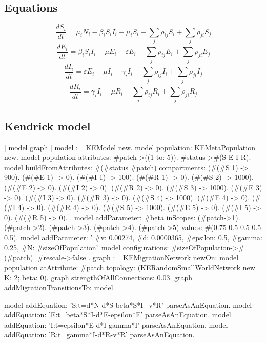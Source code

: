 \documentclass[a4paper,10pt,twoside]{book}
\begin{document}
\subsection{ Equations}

  \begin{equation}
    \frac{dS_i}{dt} = \mu_i N_i - \beta_i S_i I_i - \mu_i S_i - \sum_j \rho_{ij} S_i + \sum_j \rho_{ji} S_j
  \end{equation}
  \begin{equation}
    \frac{dE_i}{dt} = \beta_i S_i I_i - \mu E_i - \varepsilon E_i - \sum_j \rho_{ij} E_i + \sum_j \rho_{ji} E_j
  \end{equation}
  \begin{equation}
    \frac{dI_i}{dt} = \varepsilon E_i - \mu I_i - \gamma_i I_i - \sum_j \rho_{ij} I_i + \sum_j \rho_{ji} I_j
  \end{equation}
  \begin{equation}
    \frac{dR_i}{dt} = \gamma_i I_i - \mu R_i - \sum_j \rho_{ij} R_i + \sum_j \rho_{ji} R_j
  \end{equation}
  
\subsection{ Kendrick model}

\begin{code}{}
| model graph |
model := KEModel new.
model population: KEMetaPopulation new.
model population attributes: {
	#patch->((1 to: 5)).
	#status->#(S E I R)}.
model
	buildFromAttributes: #(#status #patch)
	compartments: {
		  (#(#S 1) -> 900). (#(#E 1) -> 0). (#(#I 1) -> 100). (#(#R 1) -> 0).
        (#(#S 2) -> 1000). (#(#E 2) -> 0). (#(#I 2) -> 0). (#(#R 2) -> 0).
        (#(#S 3) -> 1000). (#(#E 3) -> 0). (#(#I 3) -> 0). (#(#R 3) -> 0).
        (#(#S 4) -> 1000). (#(#E 4) -> 0). (#(#I 4) -> 0). (#(#R 4) -> 0).
        (#(#S 5) -> 1000). (#(#E 5) -> 0). (#(#I 5) -> 0). (#(#R 5) -> 0).
	}.
model
	addParameter: #beta
	inScopes: {
		(#patch->1).
		(#patch->2).
		(#patch->3).
		(#patch->4).
		(#patch->5)
	}
	values: #(0.75 0.5 0.5 0.5 0.5).
model addParameter: '{
	#v: 0.00274,
	#d: 0.0000365,
	#epsilon: 0.5,
	#gamma: 0.25,
	#N: #sizeOfPopulation}'.
model configurations: {
		#sizeOfPopulation->#(#patch).
		#rescale->false }.
graph := KEMigrationNetwork
				newOn: model population
				atAttribute: #patch
				topology: (KERandomSmallWorldNetwork new K: 2; beta: 0).
graph strengthOfAllConnections: 0.03.
graph addMigrationTransitionsTo: model.

model addEquation: 'S:t=d*N-d*S-beta*S*I+v*R' parseAsAnEquation.
model addEquation: 'E:t=beta*S*I-d*E-epsilon*E' parseAsAnEquation.
model addEquation: 'I:t=epsilon*E-d*I-gamma*I' parseAsAnEquation.
model addEquation: 'R:t=gamma*I-d*R-v*R' parseAsAnEquation.
\end{code}






\printindex
\end{document}
